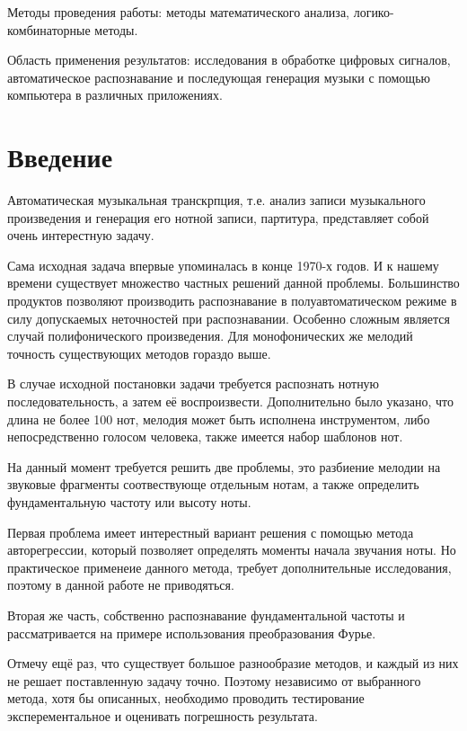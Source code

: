 \documentclass[oneside, final, 14pt]{extarticle}
\begin{document}
Методы проведения работы: методы математического анализа, логико-комбинаторные
методы.

Область применения результатов: исследования в обработке цифровых сигналов,
автоматическое распознавание и последующая генерация музыки с помощью
компьютера в различных приложениях.

\cleardoublepage


\tableofcontents
\cleardoublepage

\section{Введение}
	Автоматическая музыкальная транскрпция, т.е. анализ записи музыкального произведения
	и генерация его нотной записи, партитура, представляет собой очень интерестную задачу.

	Сама исходная задача впервые упоминалась в конце 1970-х годов. И к нашему времени
	существует множество частных решений данной проблемы. Большинство продуктов позволяют
	производить распознавание в полуавтоматическом режиме в силу допускаемых неточностей
	при распознавании. Особенно сложным является случай полифонического произведения.
	Для монофонических же мелодий точность существующих методов гораздо выше.

	В случае исходной постановки задачи требуется распознать нотную последовательность,
	а затем её воспроизвести. Дополнительно было указано, что длина не более 100 нот,
	мелодия может быть исполнена инструментом, либо непосредственно голосом человека,
	также имеется набор шаблонов нот.

	На данный момент требуется решить две проблемы, это разбиение мелодии на звуковые
	фрагменты соотвествующе отдельным нотам, а также определить фундаментальную частоту
	или высоту ноты.

	Первая проблема имеет интерестный вариант решения с помощью метода авторегрессии,
	который позволяет определять моменты начала звучания ноты. Но практическое
	применеие данного метода, требует дополнительные исследования, поэтому в данной
	работе не приводяться.

	Вторая же часть, собственно распознавание фундаментальной частоты и рассматривается
	на примере использования преобразования Фурье.

	Отмечу ещё раз, что существует большое разнообразие методов, и каждый из них
	не решает поставленную задачу точно. Поэтому независимо от выбранного метода, хотя
	бы описанных, необходимо проводить тестирование эксперементальное и оценивать
	погрешность результата.
\end{document}
